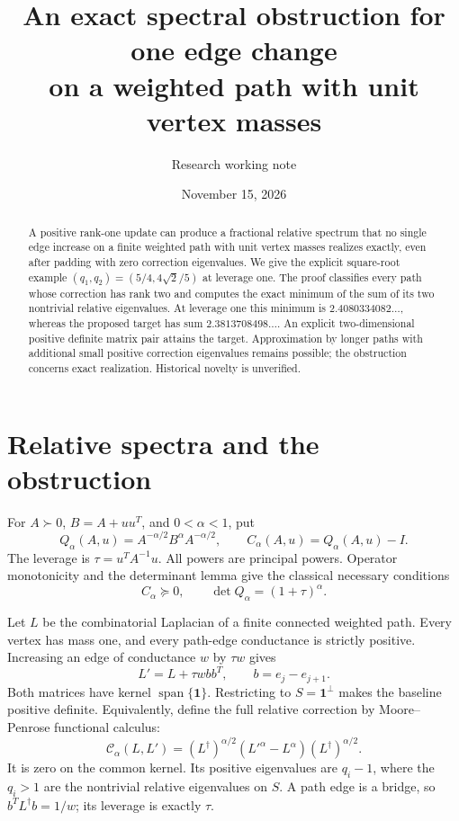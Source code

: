 \documentclass[11pt]{article}
\title{An exact spectral obstruction for one edge change\protect\\
on a weighted path with unit vertex masses}
\author{Research working note}
\date{November 15, 2026}
\newcommand{\spanof}{\operatorname{span}}
\begin{document}
\maketitle

\begin{abstract}
A positive rank-one update can produce a fractional relative spectrum
that no single edge increase on a finite weighted path with unit vertex
masses realizes exactly, even after padding with zero correction
eigenvalues. We give the explicit square-root example
$(q_1,q_2)=(5/4,4\sqrt2/5)$ at leverage one. The proof classifies every
path whose correction has rank two and computes the exact minimum of
the sum of its two nontrivial relative eigenvalues. At leverage one
this minimum is $2.4080334082\ldots$, whereas the proposed target has
sum $2.3813708498\ldots$. An explicit two-dimensional positive definite
matrix pair attains the target. Approximation by longer paths with
additional small positive correction eigenvalues remains possible;
the obstruction concerns exact realization. Historical novelty is
unverified.
\end{abstract}

\section{Relative spectra and the obstruction}

For $A\succ0$, $B=A+uu^T$, and $0<\alpha<1$, put
\[
 Q_\alpha(A,u)=A^{-\alpha/2}B^\alpha A^{-\alpha/2},
 \qquad C_\alpha(A,u)=Q_\alpha(A,u)-I.
\]
The leverage is $\tau=u^TA^{-1}u$. All powers are principal powers.
Operator monotonicity and the determinant lemma give the classical
necessary conditions
\begin{equation}\label{eq:budget}
 C_\alpha\succeq0,\qquad
 \det Q_\alpha=(1+\tau)^\alpha.
\end{equation}

Let $L$ be the combinatorial Laplacian of a finite connected weighted
path. Every vertex has mass one, and every path-edge conductance is
strictly positive. Increasing an edge of conductance $w$ by $\tau w$
gives
\[
 L'=L+\tau wbb^T,\qquad b=e_j-e_{j+1}.
\]
Both matrices have kernel $\spanof\{\mathbf1\}$. Restricting to
$S=\mathbf1^\perp$ makes the baseline positive definite. Equivalently,
define the full relative correction by Moore--Penrose functional
calculus:
\begin{equation}\label{eq:graphcorrection}
 \mathcal C_\alpha(L,L')
  =(L^\dagger)^{\alpha/2}(L'^\alpha-L^\alpha)
                         (L^\dagger)^{\alpha/2}.
\end{equation}
It is zero on the common kernel. Its positive eigenvalues are
$q_i-1$, where the $q_i>1$ are the nontrivial relative eigenvalues on
$S$. A path edge is a bridge, so $b^TL^\dagger b=1/w$; its leverage
is exactly $\tau$.
\end{document}
